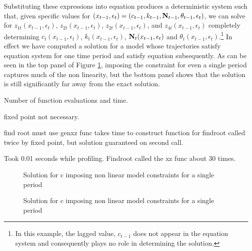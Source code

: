 \documentclass[12pt]{article}
\begin{document}
Substituting  these expressions into equation  produces
a deterministic system such that, given specific values for 
$(x_{t-1},\epsilon_{t})=(c_{t-1}, k_{t-1},{\mathbf{N}}_{t-1}, \theta_{t-1}, \epsilon_t)$, we can solve for $z_{1t}(x_{t-1},\epsilon_{t})$, $z_{2t}(x_{t-1},\epsilon_{t})$, $z_{2t}(x_{t-1},\epsilon_{t})$, and $z_{4t}(x_{t-1},\epsilon_{t})$  completely determining
$c_{t}(x_{t-1},\epsilon_{t})$, $k_{t}(x_{t-1},\epsilon_{t})$, ${\mathbf{N}}_{t}(x_{t-1},\epsilon_{t})$  and $\theta_{t}(x_{t-1},\epsilon_{t})$.\footnote{In this example, the lagged value,  $c_{t-1}$ does not appear in the equation system and consequently plays no role in determining the solution.}  In effect we have 
computed a solution for a model whose trajectories satisfy equation system 
for one time period and satisfy equation  subsequently. As can
be seen in the top panel of Figure \ref{fig:cfuncfirst}, 
imposing the constraint for even a single period captures much of the non linearity, but the bottom panel shows that the solution is 
still significantly far away from the exact solution.


Number of function evaluations and time.

fixed point not necessary.

find root must use genxz func
takes time to construct function for findroot  called twice by fixed point, but solution guaranteed on second call.




Took 0.01 seconds while profiling.  Findroot called the xz func about 30 times.
\begin{figure}
  \centering
  \caption{Solution for c imposing non linear model constraints for a single period}
  \caption{Solution for c imposing non linear model constraints for a single period}
  \label{fig:cfuncfirst}
\end{figure}
\end{document}
